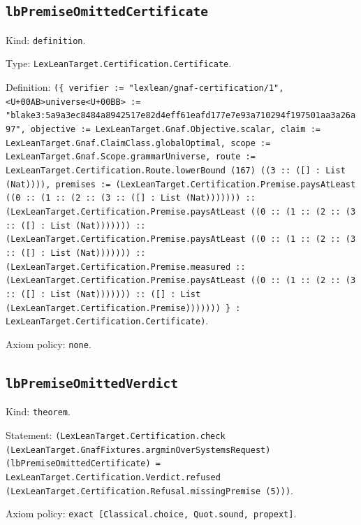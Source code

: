 \documentclass[11pt]{article}
\begin{document}
\subsection*{\texttt{lbPremiseOmittedCertificate}}
\noindent Kind: \texttt{definition}.\par
\noindent Type: \texttt{LexLeanTarget.Certification.Certificate}.\par
\noindent Definition: \texttt{(\{ verifier := "lexlean/gnaf-certification/1", <U+00AB>universe<U+00BB> := "blake3:5a9a3ec8484a8942517e82d4eff61eafd177e7e93a710294f197501aa3a26a97", objective := LexLeanTarget.Gnaf.Objective.scalar, claim := LexLeanTarget.Gnaf.ClaimClass.globalOptimal, scope := LexLeanTarget.Gnaf.Scope.grammarUniverse, route := LexLeanTarget.Certification.Route.lowerBound (167) ((3 :: ([] : List (Nat)))), premises := (LexLeanTarget.Certification.Premise.paysAtLeast ((0 :: (1 :: (2 :: (3 :: ([] : List (Nat))))))) :: (LexLeanTarget.Certification.Premise.paysAtLeast ((0 :: (1 :: (2 :: (3 :: ([] : List (Nat))))))) :: (LexLeanTarget.Certification.Premise.paysAtLeast ((0 :: (1 :: (2 :: (3 :: ([] : List (Nat))))))) :: (LexLeanTarget.Certification.Premise.measured :: (LexLeanTarget.Certification.Premise.paysAtLeast ((0 :: (1 :: (2 :: (3 :: ([] : List (Nat))))))) :: ([] : List (LexLeanTarget.Certification.Premise))))))) \} : LexLeanTarget.Certification.Certificate)}.\par
\noindent Axiom policy: \texttt{none}.\par
\subsection*{\texttt{lbPremiseOmittedVerdict}}
\noindent Kind: \texttt{theorem}.\par
\noindent Statement: \texttt{(LexLeanTarget.Certification.check (LexLeanTarget.GnafFixtures.argminOverSystemsRequest) (lbPremiseOmittedCertificate) = LexLeanTarget.Certification.Verdict.refused (LexLeanTarget.Certification.Refusal.missingPremise (5)))}.\par
\noindent Axiom policy: \texttt{exact [Classical.choice, Quot.sound, propext]}.\par
\end{document}
